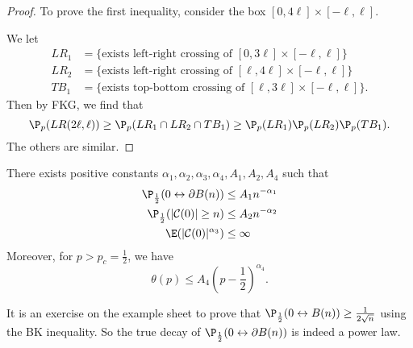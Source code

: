 \documentclass[a4paper]{article}
\begin{document}
\begin{proof}\leavevmode
  To prove the first inequality, consider the box $[0, 4\ell] \times [-\ell, \ell]$.
  \begin{center}
  \end{center}
  We let
  \begin{align*}
    LR_1 &= \{\text{exists left-right crossing of }[0, 3\ell] \times [-\ell, \ell]\}\\
    LR_2 &= \{\text{exists left-right crossing of }[\ell, 4\ell] \times [-\ell, \ell]\}\\
    TB_1 &= \{\text{exists top-bottom crossing of }[\ell, 3\ell] \times [-\ell, \ell]\}.
  \end{align*}
  Then by FKG, we find that
  \[
    \P_p(LR(2\ell, \ell)) \geq \P_p(LR_1 \cap LR_2 \cap TB_1) \geq \P_p(LR_1) \P_p(LR_2) \P_p(TB_1).
  \]
  The others are similar.
\end{proof}

\begin{thm}
  There exists positive constants $\alpha_1, \alpha_2, \alpha_3, \alpha_4, A_1, A_2, A_4$ such that
  \begin{align*}
    \P_{\frac{1}{2}} (0 \leftrightarrow \partial B(n)) &\leq A_1 n^{-\alpha_1}\\
    \P_{\frac{1}{2}} (|\mathcal{C}(0)| \geq n) &\leq A_2 n^{-\alpha_2}\\
    \E(|\mathcal{C}(0)|^{\alpha_3}) &\leq \infty
  \end{align*}
  Moreover, for $p > p_c = \frac{1}{2}$, we have
  \[
    \theta(p) \leq A_4 \left(p - \frac{1}{2}\right)^{\alpha_4}.
  \]
\end{thm}
It is an exercise on the example sheet to prove that $\P_{\frac{1}{2}}(0 \leftrightarrow B(n)) \geq \frac{1}{2\sqrt{n}}$ using the BK inequality. So the true decay of $\P_{\frac{1}{2}}(0 \leftrightarrow \partial B(n))$ is indeed a power law.
\end{document}
